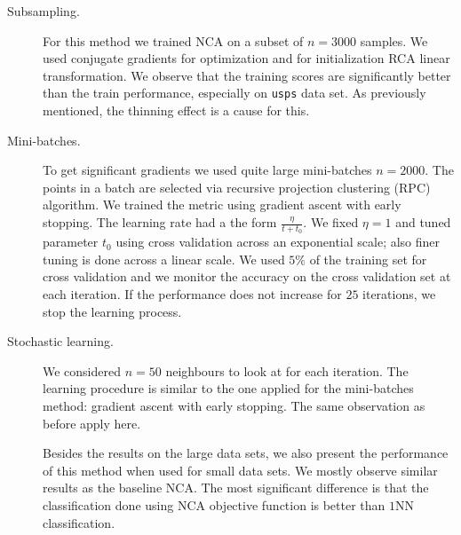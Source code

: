 \begin{description}
  \item[Subsampling.] {
    For this method we trained NCA on a subset of $n=3000$ samples. We used conjugate gradients for optimization and for initialization RCA linear transformation. We observe that the training scores are significantly better than the train performance, especially on \texttt{usps} data set. As previously mentioned, the thinning effect is a cause for this.
  }
  \item[Mini-batches.] {
    To get significant gradients we used quite large mini-batches $n=2000$. The points in a batch are selected via recursive projection clustering (RPC) algorithm. We trained the metric using gradient ascent with early stopping. The learning rate had a the form $\frac{\eta}{t+t_0}$. We fixed $\eta=1$ and tuned parameter $t_0$ using cross validation across an exponential scale; also finer tuning is done across a linear scale. We used $5\%$ of the training set for cross validation and we  monitor the accuracy on the cross validation set at each iteration. If the performance does not increase for $25$ iterations, we stop the learning process. 
  }
  \item[Stochastic learning.] {
    We considered $n=50$ neighbours to look at for each iteration. The learning procedure is similar to the one applied for the mini-batches method: gradient ascent with early stopping. The same observation as before apply here. 

    Besides the results on the large data sets, we also present the performance of this method when used for small data sets. We mostly observe similar results as the baseline NCA. The most significant difference is that the classification done using NCA objective function is better than $1$NN classification.

}
\end{description}
